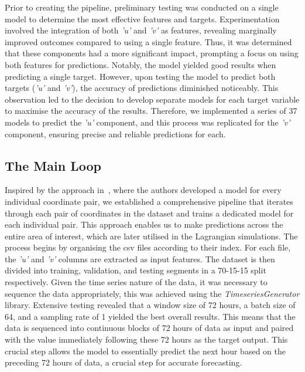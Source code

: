 Prior to creating the pipeline, preliminary testing was conducted on a single model to determine the most effective features and targets. Experimentation involved the integration of both \textit{'u'} and \textit{'v'} as features, revealing marginally improved outcomes compared to using a single feature. Thus, it was determined that these components had a more significant impact, prompting a focus on using both features for predictions. Notably, the model yielded good results when predicting a single target. However, upon testing the model to predict both targets (\textit{'u'} and \textit{'v'}), the accuracy of predictions diminished noticeably. This observation led to the decision to develop separate models for each target variable to maximise the accuracy of the results. Therefore, we implemented a series of 37 models to predict the \textit{'u'} component, and this process was replicated for the \textit{'v'} component, ensuring precise and reliable predictions for each.

\subsection{The Main Loop}
\label{subsec:3.3.2}

Inspired by the approach in~\cite{44}, where the authors developed a model for every individual coordinate pair, we established a comprehensive pipeline that iterates through each pair of coordinates in the dataset and trains a dedicated model for each individual pair. This approach enables us to make predictions across the entire area of interest, which are later utilised in the Lagrangian simulations. The process begins by organising the \acrshort{csv} files according to their index. For each file, the \textit{'u'} and \textit{'v'} columns are extracted as input features. The dataset is then divided into training, validation, and testing segments in a 70-15-15 split respectively. Given the time series nature of the data, it was necessary to sequence the data appropriately, this was achieved using the \textit{TimeseriesGenerator} library. Extensive testing revealed that a window size of 72 hours, a batch size of 64, and a sampling rate of 1 yielded the best overall results. This means that the data is sequenced into continuous blocks of 72 hours of data as input and paired with the value immediately following these 72 hours as the target output. This crucial step allows the model to essentially predict the next hour based on the preceding 72 hours of data, a crucial step for accurate forecasting.

